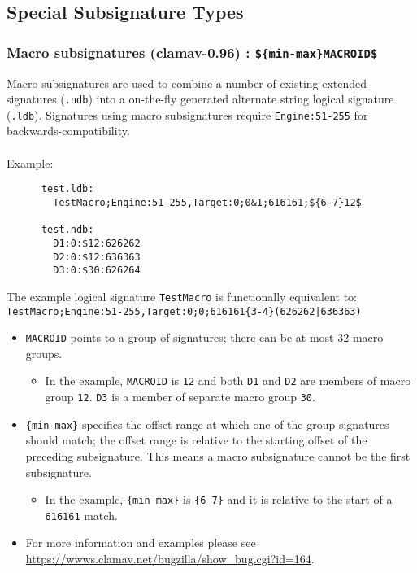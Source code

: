 \documentclass[a4paper,titlepage,12pt]{article}
\begin{document}
    \subsection{Special Subsignature Types}
    \subsubsection{Macro subsignatures (clamav-0.96) : \textnormal{\texttt{\$\{min-max\}MACROID\$}}}
    Macro subsignatures are used to combine a number of existing extended
    signatures (\verb+.ndb+) into a on-the-fly generated alternate string logical
    signature (\verb+.ldb+). Signatures using macro subsignatures require \verb+Engine:51-255+
    for backwards-compatibility.\\\\
    Example:
    \begin{verbatim}
      test.ldb:
        TestMacro;Engine:51-255,Target:0;0&1;616161;${6-7}12$

      test.ndb:
        D1:0:$12:626262
        D2:0:$12:636363
        D3:0:$30:626264
    \end{verbatim}
    The example logical signature \verb+TestMacro+ is functionally equivalent to:\\
    \verb+TestMacro;Engine:51-255,Target:0;0;616161{3-4}(626262|636363)+
    \begin{itemize}
	\item \verb+MACROID+ points to a group of signatures; there can be at most 32 macro groups.
      \begin{itemize}
      \item In the example, \verb+MACROID+ is \verb+12+ and both \verb+D1+ and \verb+D2+ are members 
        of macro group \verb+12+. \verb+D3+ is a member of separate macro group \verb+30+.
      \end{itemize}
    \item \verb+{min-max}+ specifies the offset range at which one of the group signatures should match;
      the offset range is relative to the starting offset of the preceding subsignature. This means a
      macro subsignature cannot be the first subsignature.
      \begin{itemize}
      \item In the example, \verb+{min-max}+ is \verb+{6-7}+ and it is relative to the start of a \verb+616161+ match.
      \end{itemize}
	\item For more information and examples please see \url{https://wwws.clamav.net/bugzilla/show_bug.cgi?id=164}.
    \end{itemize}
\end{document}
